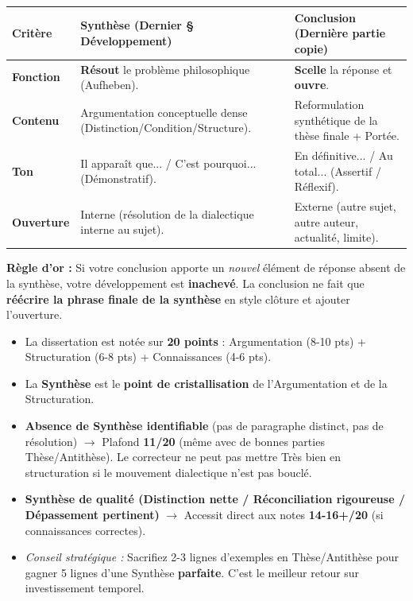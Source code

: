 \documentclass[11pt]{article}
\begin{document}
\begin{aretenir}
\begin{center}
\begin{tabularx}{\linewidth}{|l|X|X|}\hline
\rowcolor{popblueL}
\textbf{Critère} & \textbf{Synthèse (Dernier § Développement)} & \textbf{Conclusion (Dernière partie copie)} \\ \hline
\textbf{Fonction} & \textbf{Résout} le problème philosophique (Aufheben). & \textbf{Scelle} la réponse et \textbf{ouvre}. \\ \hline
\textbf{Contenu} & Argumentation conceptuelle dense (Distinction/Condition/Structure). & Reformulation synthétique de la thèse finale + Portée. \\ \hline
\textbf{Ton} & \og{} Il apparaît que... / C'est pourquoi... \fg{} (Démonstratif). & \og{} En définitive... / Au total... \fg{} (Assertif / Réflexif). \\ \hline
\textbf{Ouverture} & Interne (résolution de la dialectique interne au sujet). & Externe (autre sujet, autre auteur, actualité, limite). \\ \hline
\end{tabularx}
\end{center}
\textbf{Règle d'or :} Si votre conclusion apporte un \emph{nouvel} élément de réponse absent de la synthèse, votre développement est \textbf{inachevé}. La conclusion ne fait que \textbf{réécrire la phrase finale de la synthèse} en style \og{} clôture \fg{} et ajouter l'ouverture.
\end{aretenir}

\begin{savaistu}
\begin{itemize}
    \item La dissertation est notée sur \textbf{20 points} : \og{} Argumentation \fg{} (8-10 pts) + \og{} Structuration \fg{} (6-8 pts) + \og{} Connaissances \fg{} (4-6 pts).
    \item La \textbf{Synthèse} est le \textbf{point de cristallisation} de l'Argumentation et de la Structuration.
    \item \textbf{Absence de Synthèse identifiable} (pas de paragraphe distinct, pas de résolution) $\rightarrow$ Plafond \textbf{11/20} (même avec de bonnes parties Thèse/Antithèse). Le correcteur ne peut pas mettre \og{} Très bien \fg{} en structuration si le mouvement dialectique n'est pas bouclé.
    \item \textbf{Synthèse de qualité (Distinction nette / Réconciliation rigoureuse / Dépassement pertinent)} $\rightarrow$ Accessit direct aux notes \textbf{14-16+/20} (si connaissances correctes).
    \item \emph{Conseil stratégique :} Sacrifiez 2-3 lignes d'exemples en Thèse/Antithèse pour gagner 5 lignes d'une Synthèse \textbf{parfaite}. C'est le meilleur retour sur investissement temporel.
\end{itemize}
\end{savaistu}
\end{document}
